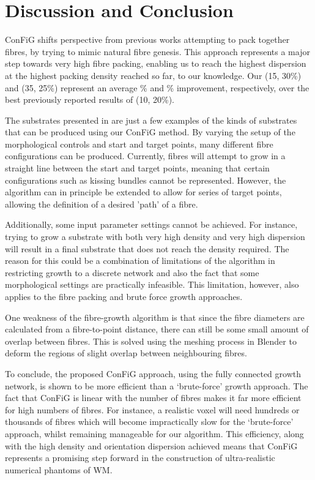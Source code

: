\section{Discussion and Conclusion}
\label{sec:discussion}
ConFiG shifts perspective from previous works attempting to pack together fibres, by trying to mimic natural fibre genesis.
This approach represents a major step towards very high fibre packing, enabling us to reach the highest dispersion at the highest packing density reached so far, to our knowledge. Our (15\degree, 30\%) and (35\degree, 25\%) represent an average \% and \% improvement, respectively, over the best previously reported results of (10\degree, 20\%)\cite{Ginsburger2018}.


The substrates presented in  are just a few examples of the kinds of substrates that can be produced using our ConFiG method.
By varying the setup of the morphological controls and start and target points, many different fibre configurations can be produced.
Currently, fibres will attempt to grow in a straight line between the start and target points, meaning that certain configurations such as kissing bundles cannot be represented.
However, the algorithm can in principle be extended to allow for series of target points, allowing the definition of a desired 'path' of a fibre.

Additionally, some input parameter settings cannot be achieved.
For instance, trying to grow a substrate with both very high density and very high dispersion will result in a final substrate that does not reach the density required.
The reason for this could be a combination of limitations of the algorithm in restricting growth to a discrete network and also the fact that some morphological settings are practically infeasible.
This limitation, however, also applies to the fibre packing and  brute force growth approaches.

One weakness of the fibre-growth algorithm is that since the fibre diameters are calculated from a fibre-to-point distance, there can still be some small amount of overlap between fibres.
This is solved using the meshing process in Blender to deform the regions of slight overlap between neighbouring fibres.

To conclude, the proposed ConFiG approach, using the fully connected growth network, is shown to be more efficient than a `brute-force' growth approach.
The fact that ConFiG is linear with the number of fibres makes it far more efficient for high numbers of fibres. For instance, a realistic voxel will need hundreds or thousands of fibres which will become impractically slow for the `brute-force' approach, whilst remaining manageable for our algorithm.
This efficiency, along with the high density and orientation dispersion achieved means that ConFiG represents a promising step forward in the construction of ultra-realistic numerical phantoms of WM.


